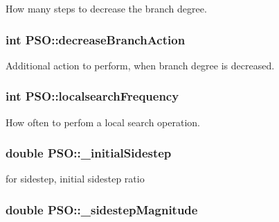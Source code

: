 How many steps to decrease the branch degree. 

\hypertarget{classPSO_bc3eecdfc1be03c6bfa6b31d4ae47885}{
\subsubsection{\setlength{\rightskip}{0pt plus 5cm}int {\bf PSO::decreaseBranchAction}}}
\label{classPSO_bc3eecdfc1be03c6bfa6b31d4ae47885}


Additional action to perform, when branch degree is decreased. 

\hypertarget{classPSO_9357eeeeaa65d768dcd9c6179d8a8e9a}{
\subsubsection{\setlength{\rightskip}{0pt plus 5cm}int {\bf PSO::localsearchFrequency}}}
\label{classPSO_9357eeeeaa65d768dcd9c6179d8a8e9a}


How often to perfom a local search operation. 

\hypertarget{classPSO_b67e6a37add2bc3b1c7f2ef74873ade5}{
\subsubsection{\setlength{\rightskip}{0pt plus 5cm}double {\bf PSO::\_\-initialSidestep}}}
\label{classPSO_b67e6a37add2bc3b1c7f2ef74873ade5}


for sidestep, initial sidestep ratio 

\hypertarget{classPSO_9bd8aa711c1550d3b0a36c4c892785ea}{
\subsubsection{\setlength{\rightskip}{0pt plus 5cm}double {\bf PSO::\_\-sidestepMagnitude}}}
\label{classPSO_9bd8aa711c1550d3b0a36c4c892785ea}


